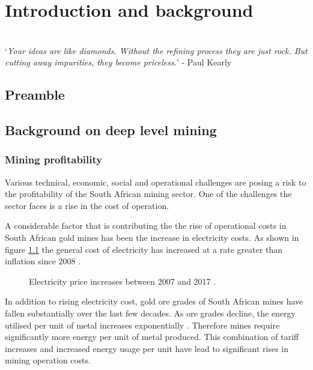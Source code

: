 \chapter{Introduction and background}  %
\setcounter{page}{1}
\vspace{38em}

\hrulefill
\\
\enquote*{\textit{Your ideas are like diamonds. Without the refining process they are just rock. But cutting away impurities, they become priceless.}} - Paul Kearly\\
\newpage


\section{Preamble}

\section{Background on deep level mining}

\subsection{Mining profitability}
 Various technical, economic, social and operational challenges are posing a risk to the profitability of the South African mining sector. One of the challenges the sector faces  is a rise in the cost of operation\cite{neingo2016trends}.\par
A considerable factor that is contributing the the rise of operational costs in South African gold mines has been the increase in electricity costs. As shown in figure \ref{fig: Eskom tariffs} the general cost of electricity has increased at a rate greater than inflation since 2008 \cite{Eskom2013Tariffs}.
\begin{figure}[h]
	\centering
	\fbox{}
	\caption[Electricity price increases between 2007 and 2017.]{Electricity price increases between 2007 and 2017 \cite{Eskom2013Tariffs,Inflation2013}.}
	\label{fig: Eskom tariffs}
\end{figure}
\par
In addition to rising electricity cost, gold ore grades of South African mines have fallen substantially over the last few decades\cite{mudd2007global}. As ore grades decline, the energy utilised per unit of metal increases exponentially \cite{muller2010numerical}. Therefore mines require significantly more energy per unit of metal produced. This combination of tariff increases and increased energy usage per unit  have lead to significant rises in mining operation costs. \par

